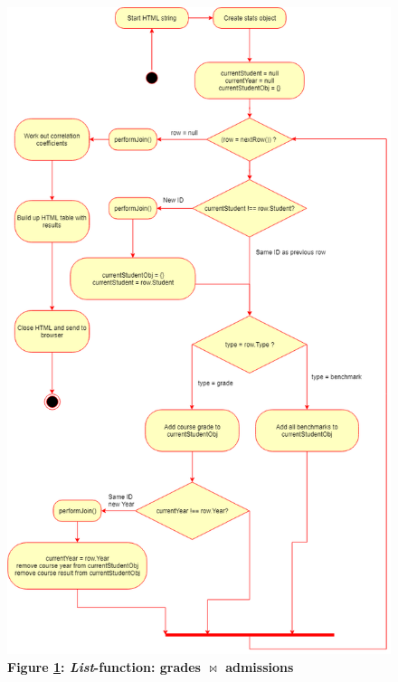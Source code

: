 \begin{figure}[H]
    \centering
    \begin{mdframed}
        \centering
        \includegraphics[scale=0.5]{./resources/figures/fig-listfn-correlation-grades.png}
    \end{mdframed}
    \caption[\textit{List}-function: \texorpdfstring{grades $\bowtie$ admissions}{Lg}]{\textbf{Figure \ref{fig-listfn-correlation-grades}: \textit{List}-function: \texorpdfstring{grades $\bowtie$ admissions}{Lg}}}
    \label{fig-listfn-correlation-grades}
\end{figure}
